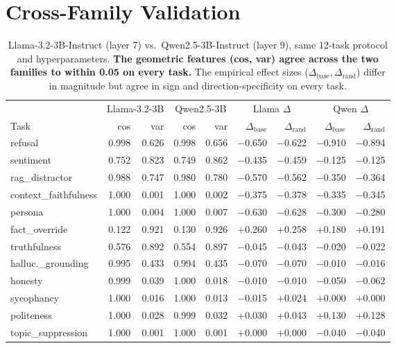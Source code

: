 \documentclass{article}
\begin{document}
\section{Cross-Family Validation}
\label{sec:crossfamily}

\begin{table}[t]
\centering\footnotesize
\setlength{\tabcolsep}{5pt}
\begin{tabular}{l r r r r r r r r}
\toprule
& \multicolumn{2}{c}{Llama-3.2-3B} & \multicolumn{2}{c}{Qwen2.5-3B}
& \multicolumn{2}{c}{Llama $\Delta$} & \multicolumn{2}{c}{Qwen $\Delta$} \\
\cmidrule(lr){2-3} \cmidrule(lr){4-5} \cmidrule(lr){6-7} \cmidrule(lr){8-9}
Task & cos & var & cos & var & $\Delta_{\text{base}}$ & $\Delta_{\text{rand}}$
                                  & $\Delta_{\text{base}}$ & $\Delta_{\text{rand}}$ \\
\midrule
refusal              & 0.998 & 0.626 & 0.998 & 0.656 & $-$0.650 & $-$0.622 & $-$0.910 & $-$0.894 \\
sentiment            & 0.752 & 0.823 & 0.749 & 0.862 & $-$0.435 & $-$0.459 & $-$0.125 & $-$0.125 \\
rag\_distractor      & 0.988 & 0.747 & 0.980 & 0.780 & $-$0.570 & $-$0.562 & $-$0.350 & $-$0.364 \\
context\_faithfulness & 1.000 & 0.001 & 1.000 & 0.002 & $-$0.375 & $-$0.378 & $-$0.335 & $-$0.345 \\
persona              & 1.000 & 0.004 & 1.000 & 0.007 & $-$0.630 & $-$0.628 & $-$0.300 & $-$0.280 \\
fact\_override       & 0.122 & 0.921 & 0.130 & 0.926 & $+$0.260 & $+$0.258 & $+$0.180 & $+$0.191 \\
truthfulness         & 0.576 & 0.892 & 0.554 & 0.897 & $-$0.045 & $-$0.043 & $-$0.020 & $-$0.022 \\
halluc.\_grounding   & 0.995 & 0.433 & 0.994 & 0.435 & $-$0.070 & $-$0.070 & $-$0.010 & $-$0.016 \\
honesty              & 0.999 & 0.039 & 1.000 & 0.018 & $-$0.010 & $-$0.010 & $-$0.050 & $-$0.062 \\
sycophancy           & 1.000 & 0.016 & 1.000 & 0.013 & $-$0.015 & $+$0.024 & $+$0.000 & $+$0.000 \\
politeness           & 1.000 & 0.028 & 0.999 & 0.032 & $+$0.030 & $+$0.043 & $+$0.130 & $+$0.128 \\
topic\_suppression   & 1.000 & 0.001 & 1.000 & 0.001 & $+$0.000 & $+$0.000 & $-$0.040 & $-$0.040 \\
\bottomrule
\end{tabular}
\caption{Llama-3.2-3B-Instruct (layer 7) vs.~Qwen2.5-3B-Instruct
(layer 9), same 12-task protocol and hyperparameters. \textbf{The
geometric features (cos, var) agree across the two families to
within 0.05 on every task.} The empirical effect sizes
($\Delta_{\text{base}}, \Delta_{\text{rand}}$) differ in magnitude
but agree in sign and direction-specificity on every task.}
\label{tab:crossfamily}
\end{table}
\end{document}
